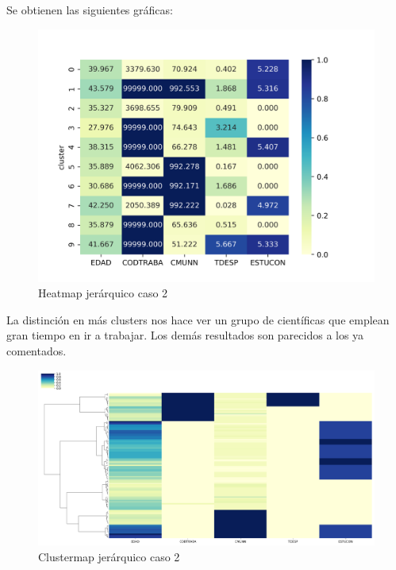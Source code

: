 Se obtienen las siguientes gráficas:

\begin{figure}[H] %
	\centering
	\includegraphics[scale=0.7]{heatmap-jerarquico2.png}  %
	\caption{Heatmap jerárquico caso 2} 
	\label{fig:heatmap-jerarq-caso2}
\end{figure}

La distinción en más clusters nos hace ver un grupo de científicas que emplean gran tiempo en ir a trabajar. Los demás resultados son parecidos a los ya comentados.

\begin{figure}[H] %
	\centering
	\includegraphics[scale=0.4]{clustermap2.png}  %
	\caption{Clustermap jerárquico caso 2} 
	\label{fig:clustermap-caso2}
\end{figure}

